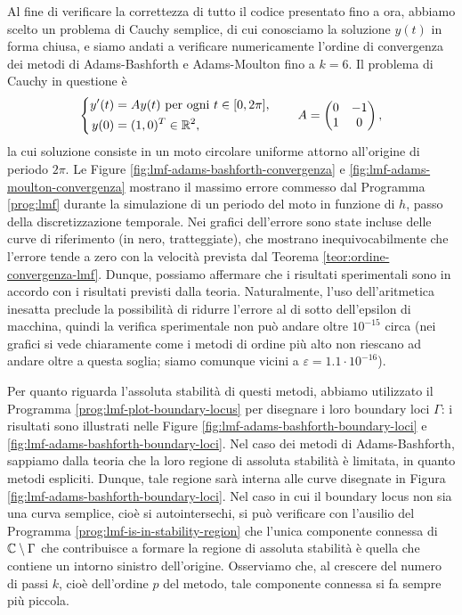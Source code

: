 Al fine di verificare la correttezza di tutto il codice presentato fino a ora,
abbiamo scelto un problema di Cauchy semplice, di cui conosciamo la soluzione
$y(t)$ in forma chiusa, e siamo andati a verificare numericamente l'ordine
di convergenza dei metodi di Adams-Bashforth e Adams-Moulton fino a $k=6$.
Il problema di Cauchy in questione è
\begin{equation} \label{eq:problema-moto-circolare-uniforme}
\left\{
\begin{aligned}
y'(t) &= Ay(t) \text{ per ogni $t \in [0,2\pi]$}, \\
y(0)  &= (1,0)^T \in \mathbb{R}^2,
\end{aligned}
\right.
\qquad
A = \begin{pmatrix}
0 & -1 \\ 
1 & 0
\end{pmatrix},
\end{equation}
la cui soluzione consiste in un moto circolare uniforme attorno all'origine
di periodo $2\pi$. Le Figure \ref{fig:lmf-adams-bashforth-convergenza} e
\ref{fig:lmf-adams-moulton-convergenza} mostrano il massimo errore commesso
dal Programma \ref{prog:lmf} durante la simulazione di un periodo del
moto in funzione di $h$, passo della discretizzazione temporale.
Nei grafici dell'errore sono state incluse delle curve di riferimento
(in nero, tratteggiate), che mostrano inequivocabilmente che l'errore
tende a zero con la velocità prevista dal Teorema \ref{teor:ordine-convergenza-lmf}.
Dunque, possiamo affermare che i risultati sperimentali sono in accordo con
i risultati previsti dalla teoria. Naturalmente, l'uso dell'aritmetica
inesatta preclude la possibilità di ridurre l'errore al di sotto
dell'epsilon di macchina, quindi la verifica sperimentale non può andare
oltre $10^{-15}$ circa (nei grafici si vede chiaramente come i metodi
di ordine più alto non riescano ad andare oltre a questa soglia;
siamo comunque vicini a $\varepsilon = 1.1 \cdot 10^{-16}$).

Per quanto riguarda l'assoluta stabilità di questi metodi, abbiamo utilizzato
il Programma \ref{prog:lmf-plot-boundary-locus} per disegnare i loro
boundary loci $\Gamma$: i risultati sono illustrati nelle Figure
\ref{fig:lmf-adams-bashforth-boundary-loci} e \ref{fig:lmf-adams-bashforth-boundary-loci}.
Nel caso dei metodi di Adams-Bashforth, sappiamo dalla teoria che la loro
regione di assoluta stabilità è limitata, in quanto metodi espliciti.
Dunque, tale regione sarà interna alle curve disegnate in Figura
\ref{fig:lmf-adams-bashforth-boundary-loci}.
Nel caso in cui il boundary locus non sia una curva semplice, cioè
si autointersechi, si può verificare con l'ausilio del Programma
\ref{prog:lmf-is-in-stability-region} che l'unica componente connessa
di $\mathbb{C} \setminus \Gamma$ che contribuisce a formare la regione di assoluta stabilità
è quella che contiene un intorno sinistro dell'origine.
Osserviamo che, al crescere del numero di passi $k$, cioè dell'ordine $p$
del metodo, tale componente connessa si fa sempre più piccola.

